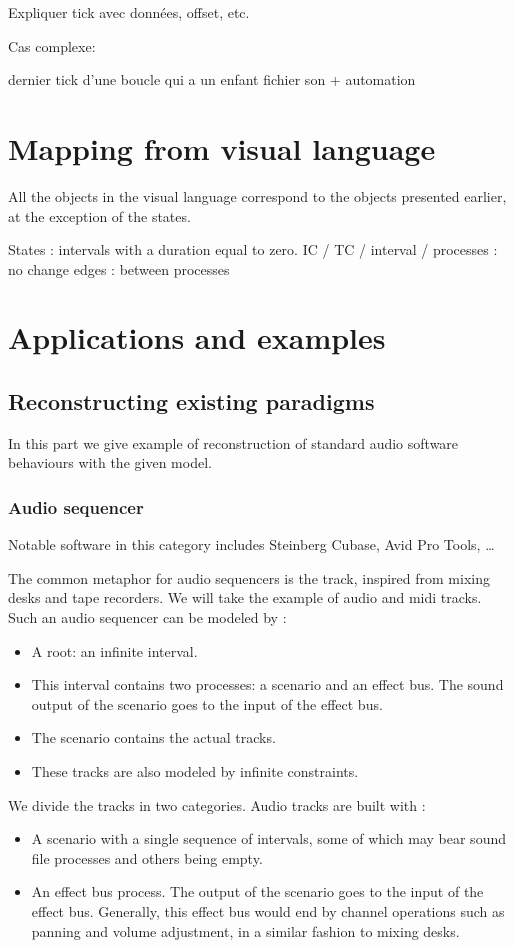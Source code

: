 \documentclass{article}
\begin{document}
Expliquer tick avec données, offset, etc.

Cas complexe: 

dernier tick d'une boucle qui a un enfant fichier son + automation



\section{Mapping from visual language}
All the objects in the visual language correspond to the objects presented earlier, at the exception of the states.

States : intervals with a duration equal to zero.
IC / TC / interval / processes : no change
edges : between processes
\section{Applications and examples}

\subsection{Reconstructing existing paradigms}\label{sec.existingparadigms}
In this part we give example of reconstruction of standard audio software behaviours with the given model.
\subsubsection{Audio sequencer}
Notable software in this category includes Steinberg Cubase, Avid Pro Tools, \dots

The common metaphor for audio sequencers is the track, inspired from mixing desks and tape recorders. 
We will take the example of audio and midi tracks. 
Such an audio sequencer can be modeled by : 

\begin{itemize}
    \item A root: an infinite interval.
    \item This interval contains two processes: a scenario and an effect bus. 
    The sound output of the scenario goes to the input of the effect bus.
    \item The scenario contains the actual tracks.
    \item These tracks are also modeled by infinite constraints.
\end{itemize}

We divide the tracks in two categories.
Audio tracks are built with : 
\begin{itemize}
  \item A scenario with a single sequence of intervals, some of which may bear sound file processes and others being empty.
  \item An effect bus process. The output of the scenario goes to the input of the effect bus. Generally, this effect bus would end by channel operations such as panning and volume adjustment, in a similar fashion to mixing desks.
\end{itemize} 
\end{document}

